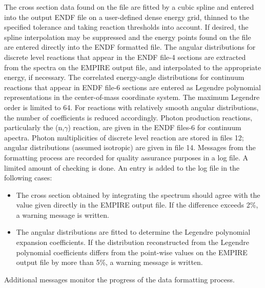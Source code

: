 The cross section data found on the file are fitted by a cubic spline
and entered into the output ENDF file  on a user-defined
dense energy grid, thinned to the specified tolerance and taking reaction
thresholds into account. If desired, the spline interpolation may
be suppressed and the energy points found on the file are entered
directly into the ENDF formatted file.
The angular distributions for discrete level reactions that appear
in the ENDF file-4 sections are extracted from the spectra on the
EMPIRE output file, and interpolated to the appropriate
energy, if necessary.
The correlated energy-angle distributions for continuum reactions
that appear in ENDF file-6 sections are entered as Legendre polynomial
representations in the center-of-mass coordinate system. The maximum
Legendre order is limited to 64. For reactions with relatively smooth
angular distributions, the number of coefficients is reduced accordingly.
Photon production reactions, particularly
the (n,$\gamma$) reaction, are given in the ENDF files-6 for continuum
apectra. Photon multiplicities of discrete level reaction are stored
in files 12; angular distributions (assumed isotropic) are given in file 14.
Messages from the formatting process are recorded for quality assurance purposes
in a log file. A limited amount
of checking is done. An entry is added to the log file in the following
cases:
\begin{itemize}
\item The cross section obtained by integrating the spectrum should agree
with the value given directly in the EMPIRE output file.
If the difference exceeds 2\%, a warning message is written.
\item The angular distributions are fitted to determine the Legendre polynomial
expansion coefficients. If the distribution reconstructed from the
Legendre polynomial coefficients differs from the point-wise values
on the EMPIRE output file by more than 5\%, a warning message is written.
\end{itemize}
Additional messages monitor the progress of the data formatting process.

